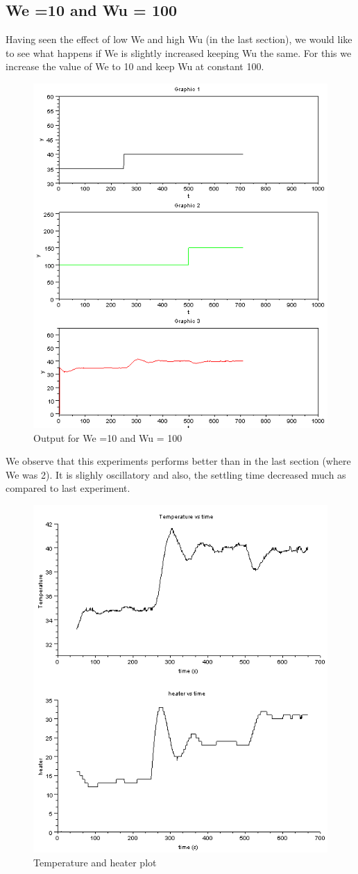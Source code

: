 \subsection{We =10 and Wu = 100}
Having seen the effect of low We and high Wu (in the last section), we would like to see what happens if We is slightly increased keeping Wu the same. For this we increase the value of We to 10 and keep Wu at constant 100.
\begin{figure}[H]
\centering
  \includegraphics[width=0.8\linewidth]{mpc/5_3.PNG}
  \caption{Output for We =10 and Wu = 100}
\end{figure}
We observe that this experiments performs better than in the last section (where We was 2). It is slighly oscillatory and also, the settling time decreased much as compared to last experiment.
\begin{figure}[H]
\centering
  \includegraphics[width=0.8\linewidth]{mpc/5_3_heater_final.png}
  \caption{Temperature and heater plot}
\end{figure}

